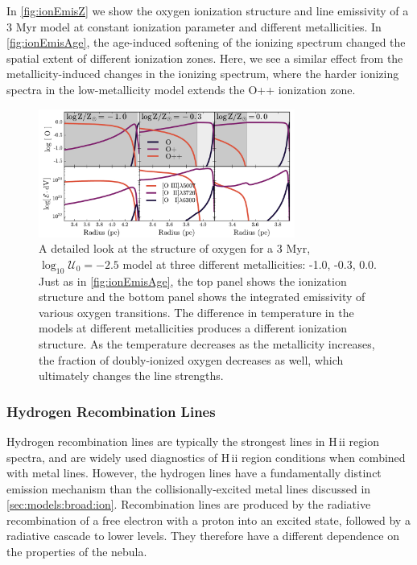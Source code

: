 \documentclass[twocolumn, tighten]{aastex61}
\newcommand{\Fig}[1]{\autoref{fig:#1}}
\newcommand{\Sec}[1]{\autoref{sec:#1}}
\newcommand{\logten}{\ensuremath{\log_{10}}}
\newcommand{\hii}{H\,{\sc ii}\xspace}
\newcommand{\logU}{\ensuremath{\logten \mathcal{U}_0}}
\begin{document}
In \Fig{ionEmisZ} we show the oxygen ionization structure and line emissivity of a 3 Myr model at constant ionization parameter and different metallicities. In \Fig{ionEmisAge}, the age-induced softening of the ionizing spectrum changed the spatial extent of different ionization zones. Here, we see a similar effect from the metallicity-induced changes in the ionizing spectrum, where the harder ionizing spectra in the low-metallicity model extends the O++ ionization zone.

\begin{figure}
  \begin{centering}
    \includegraphics[width=0.75\textwidth]{f8.pdf}
    \caption{A detailed look at the structure of oxygen for a 3 Myr, $\logU = -2.5$ model at three different metallicities: -1.0, -0.3, 0.0. Just as in \Fig{ionEmisAge}, the top panel shows the ionization structure and the bottom panel shows the integrated emissivity of various oxygen transitions. The difference in temperature in the models at different metallicities produces a different ionization structure. As the temperature decreases as the metallicity increases, the fraction of doubly-ionized oxygen decreases as well, which ultimately changes the line strengths.}
    \label{fig:ionEmisZ}
  \end{centering}
\end{figure}

\subsubsection{Hydrogen Recombination Lines} \label{sec:models:broad:H}

Hydrogen recombination lines are typically the strongest lines in \hii region spectra, and are widely used diagnostics of \hii region conditions when combined with metal lines. However, the hydrogen lines have a fundamentally distinct emission mechanism than the collisionally-excited metal lines discussed in \Sec{models:broad:ion}. Recombination lines are produced by the radiative recombination of a free electron with a proton into an excited state, followed by a radiative cascade to lower levels. They therefore have a different dependence on the properties of the nebula.
\end{document}
